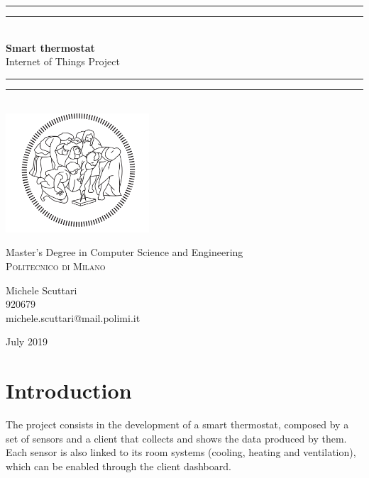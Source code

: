 \documentclass[12pt,a4paper]{report}
\begin{document}
\begin{titlepage}
	\centering
	
	\rule[0.5ex]{\linewidth}{2pt}\vspace*{-\baselineskip}\vspace*{3.2pt}
	\rule[0.5ex]{\linewidth}{1pt}\\[\baselineskip]
	
	{\huge\bfseries Smart thermostat}\\[4mm]
	{\large Internet of Things Project}\\[3mm]
	
	\rule[0.5ex]{\linewidth}{1pt}\vspace*{-\baselineskip}\vspace{3.2pt}
    \rule[0.5ex]{\linewidth}{2pt}\\[\baselineskip]
    
	\vspace{2cm}
	\includegraphics[width=0.4\textwidth]{images/Polimi.png}\par
	\vspace{2mm}
	{\large Master's Degree in Computer Science and Engineering\\
	\vspace{2mm}
	\textsc{Politecnico di Milano}}

    \vspace{3cm}
	{\Large Michele Scuttari\\
	920679\\
	michele.scuttari@mail.polimi.it\par}

	
    \vfill
	{\large July 2019 \par}
	\vspace{1cm}
\end{titlepage}

\section*{Introduction}
The project consists in the development of a smart thermostat, composed by a set of sensors and a client that collects and shows the data produced by them. Each sensor is also linked to its room systems (cooling, heating and ventilation), which can be enabled through the client dashboard.
\end{document}
